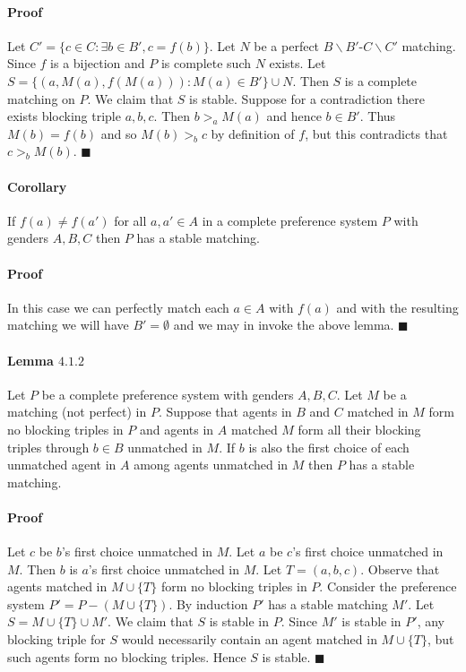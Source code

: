 \documentclass[letterpaper,12pt,oneside,onecolumn]{article}
\begin{document}
\paragraph{Proof}
Let $C' = \{ c \in C : \exists b\in B', c = f(b)\}$. Let $N$ be a perfect $B\backslash B'$-$C\backslash C'$ matching. Since $f$ is a bijection and $P$ is complete such $N$ exists. Let $S = \{ (a, M(a), f(M(a))) : M(a) \in B' \} \cup N$. Then $S$ is a complete matching on $P$. We claim that $S$ is stable. Suppose for a contradiction there exists blocking triple $a,b,c$. Then $b >_a M(a)$ and hence $b \in B'$. Thus $M(b) = f(b)$ and so $M(b) >_b c$ by definition of $f$, but this contradicts that $c >_b M(b)$. $\blacksquare$
\paragraph{Corollary}
If $f(a) \neq f(a')$ for all $a,a' \in A$ in a complete preference system $P$ with genders $A,B,C$ then $P$ has a stable matching.
\paragraph{Proof}
In this case we can perfectly match each $a \in A$ with $f(a)$ and with the resulting matching we will have $B' = \emptyset$ and we may in invoke the above lemma. $\blacksquare$
\paragraph{Lemma $4.1.2$} Let $P$ be a complete preference system with genders $A,B,C$. Let $M$ be a matching (not perfect) in $P$. Suppose that agents in $B$ and $C$ matched in $M$ form no blocking triples in $P$ and agents in $A$ matched $M$ form all their blocking triples through $b \in B$ unmatched in $M$. If $b$ is also the first choice of each unmatched agent in $A$ among agents unmatched in $M$ then $P$ has a stable matching.
\paragraph{Proof}
Let $c$ be $b$'s first choice unmatched in $M$. Let $a$ be $c$'s first choice unmatched in $M$. Then $b$ is $a$'s first choice unmatched in $M$. Let $T = (a,b,c)$. Observe that agents matched in $M \cup \{T\}$ form no blocking triples in $P$. Consider the preference system $P' = P - (M \cup \{T\})$. By induction $P'$ has a stable matching $M'$. Let $S = M \cup \{T\} \cup M'$. We claim that $S$ is stable in $P$. Since $M'$ is stable in $P'$, any blocking triple for $S$ would necessarily contain an agent matched in $M \cup \{T\}$, but such agents form no blocking triples. Hence $S$ is stable. $\blacksquare$
\end{document}
